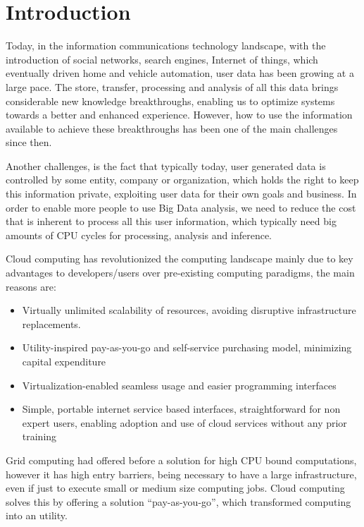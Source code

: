 
% 
% 

\section{Introduction}

Today, in the information communications technology landscape, with the introduction of social networks, search engines, Internet of things, which eventually driven home and vehicle automation, user data has been growing at a large pace. The store, transfer, processing and analysis of all this data brings considerable new knowledge breakthroughs, enabling us to optimize systems towards a better and enhanced experience. However, how to use the information available to achieve these breakthroughs has been one of the main challenges since then. 

Another challenges, is the fact that typically today, user generated data is controlled by some entity, company or organization, which holds the right to keep this information private, exploiting user data for their own goals and business. In order to enable more people to use Big Data analysis, we need to reduce the cost that is inherent to process all this user information, which typically need big amounts of CPU cycles for processing, analysis and inference.

Cloud computing has revolutionized the computing landscape mainly due to key advantages to developers/users over pre-existing computing paradigms, the main reasons are:
\begin{itemize}
  \item Virtually unlimited scalability of resources, avoiding disruptive infrastructure replacements.
  \item Utility-inspired pay-as-you-go and self-service purchasing model, minimizing capital expenditure
  \item Virtualization-enabled seamless usage and easier programming interfaces
  \item Simple, portable internet service based interfaces, straightforward for non expert users, enabling adoption and use of cloud services without any prior training
 \end{itemize} 

Grid computing had offered before a solution for high CPU bound computations, however it has high entry barriers, being necessary to have a large infrastructure, even if just to execute small or medium size computing jobs. Cloud computing solves this by offering a solution ``pay-as-you-go'', which transformed computing into an utility.

